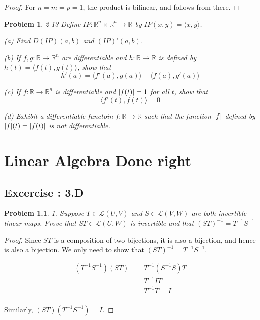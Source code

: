\documentclass[12pt]{book}
\newcommand\T{\rule{0pt}{2.6ex}}
\newcommand\B{\rule[-1.2ex]{0pt}{0pt}}
\newtheorem*{problem*}{Problem}
\newcommand{\LL}{\mathcal{L}}
\begin{document}
\begin{proof}
  For $n = m = p = 1$, the product is bilinear, and follows from there. 
\end{proof}

\begin{problem*}
  2-13 Define $IP : \mathbb{R}^n \times \mathbb{R}^n \to \mathbb{R}$ by $IP(x,y) = \langle x, y \rangle$.

  \T\B (a) Find $D(IP)(a,b)$ and $(IP)'(a,b)$.

  \T\B (b) If $f,g : \mathbb{R} \to \mathbb{R}^n$ are differentiable and $h : \mathbb{R} \to \mathbb{R}$ is defined by $h(t) = \langle f(t), g(t) \rangle$, show that
  \[
  h'(a) = \langle f'(a), g(a)\rangle + \langle f(a), g'(a)\rangle
  \]

  \T\B (c) If $f : \mathbb{R} \to \mathbb{R}^n$ is differentiable and $\abs{f(t)} = 1$ for all $t$, show that
  \[
  \langle f'(t), f(t) \rangle = 0
  \]

  \T\B (d) Exhibit a differentiable functoin $f : \mathbb{R} \to \mathbb{R}$ such that the function $\abs{f}$ defined by $\abs{f}(t) = \abs{f(t)}$ is not differentiable. 
\end{problem*}

%

\chapter{Linear Algebra Done right}

\section{Excercise : 3.D}

\begin{problem*}
  1. Suppose $T \in \LL(U,V)$ and $ S \in \LL(V,W)$ are both invertible
  linear maps. Prove that $ST \in \LL(U,W)$ is invertible and that $(ST)^{-1} = T^{-1}S^{-1}$
\end{problem*}

\begin{proof}
  Since $ST$ is a composition of two bijections, it is also a bijection, and hence is also a bijection. We only need to show that $(ST)^{-1} = T^{-1}S^{-1}$.

  \begin{align*}
    (T^{-1} S^{-1}) (S T) & = T^{-1} (S^{-1} S) T\\
    & = T^{-1} I T\\
    & = T^{-1}T = I \\
  \end{align*}

  Similarly, $(S T) (T^{-1} S^{-1}) = I$.
\end{proof}
\end{document}
